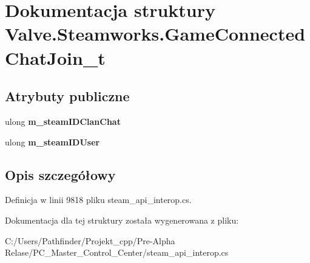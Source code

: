 \hypertarget{struct_valve_1_1_steamworks_1_1_game_connected_chat_join__t}{}\section{Dokumentacja struktury Valve.\+Steamworks.\+Game\+Connected\+Chat\+Join\+\_\+t}
\label{struct_valve_1_1_steamworks_1_1_game_connected_chat_join__t}
\subsection*{Atrybuty publiczne}
\begin{DoxyCompactItemize}
\item 
\mbox{\label{struct_valve_1_1_steamworks_1_1_game_connected_chat_join__t_aa4c0708a76d2aee453b90e6c962b2bea}} 
ulong {\bfseries m\+\_\+steam\+I\+D\+Clan\+Chat}
\item 
\mbox{\label{struct_valve_1_1_steamworks_1_1_game_connected_chat_join__t_ad0983d78aca19196d4a2e8c154d6d635}} 
ulong {\bfseries m\+\_\+steam\+I\+D\+User}
\end{DoxyCompactItemize}


\subsection{Opis szczegółowy}


Definicja w linii 9818 pliku steam\+\_\+api\+\_\+interop.\+cs.



Dokumentacja dla tej struktury została wygenerowana z pliku\+:\begin{DoxyCompactItemize}
\item 
C\+:/\+Users/\+Pathfinder/\+Projekt\+\_\+cpp/\+Pre-\/\+Alpha Relase/\+P\+C\+\_\+\+Master\+\_\+\+Control\+\_\+\+Center/steam\+\_\+api\+\_\+interop.\+cs\end{DoxyCompactItemize}

